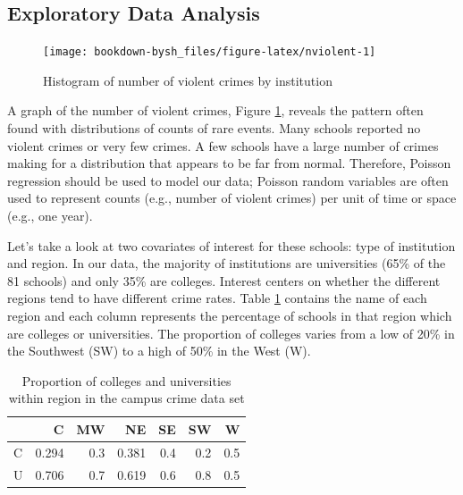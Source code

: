 \documentclass[
]{krantz}
\begin{document}
\hypertarget{exploratory-data-analysis}{%
\subsection{Exploratory Data Analysis}\label{exploratory-data-analysis}}

\begin{figure}

{\centering \texttt{[image: bookdown-bysh\_files/figure-latex/nviolent-1]} 

}

\caption{Histogram of number of violent crimes by institution}\label{fig:nviolent}
\end{figure}

A graph of the number of violent crimes, Figure \ref{fig:nviolent}, reveals the pattern often found with distributions of counts of rare events. Many schools reported no violent crimes or very few crimes. A few schools have a large number of crimes making for a distribution that appears to be far from normal. Therefore, Poisson regression should be used to model our data; Poisson random variables are often used to represent counts (e.g., number of violent crimes) per unit of time or space (e.g., one year).

Let's take a look at two covariates of interest for these schools: type of institution and region. In our data, the majority of institutions are universities (65\% of the 81 schools) and only 35\% are colleges. Interest centers on whether the different regions tend to have different crime rates. Table \ref{tab:regions} contains the name of each region and each column represents the percentage of schools in that region which are colleges or universities. The proportion of colleges varies from a low of 20\% in the Southwest (SW) to a high of 50\% in the West (W).

\begin{table}

\caption{\label{tab:regions}Proportion of colleges and universities within region in the campus crime data set}
\centering
\begin{tabular}[t]{lrrrrrr}
\toprule
  & C & MW & NE & SE & SW & W\\
\midrule
C & 0.294 & 0.3 & 0.381 & 0.4 & 0.2 & 0.5\\
U & 0.706 & 0.7 & 0.619 & 0.6 & 0.8 & 0.5\\
\bottomrule
\end{tabular}
\end{table}
\end{document}
